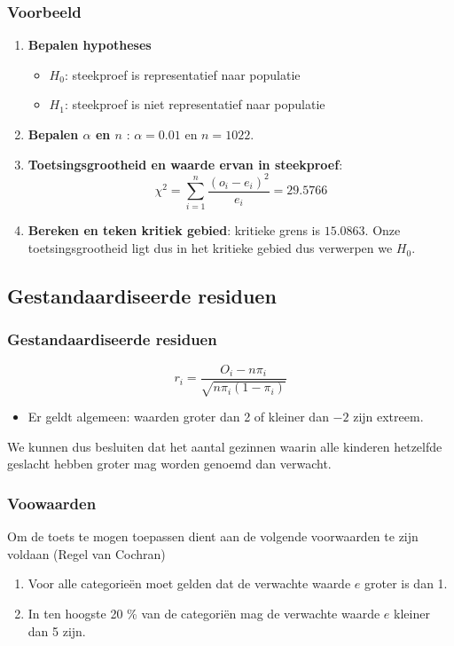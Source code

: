 \documentclass{beamer}
\begin{document}
\begin{frame}
  \frametitle{Voorbeeld}
  \begin{enumerate}
  \item \textbf{Bepalen hypotheses}
    \begin{itemize}
      \item $H_{0}$: steekproef is representatief naar populatie
      \item $H_{1}$: steekproef is niet representatief naar populatie
    \end{itemize}
  \item \textbf{Bepalen $\alpha$ en $n$} : $\alpha = 0.01$ en $n = 1022$.
  \item \textbf{Toetsingsgrootheid en waarde ervan in steekproef}:
  \[ \chi^{2} = \sum_{i=1}^{n} \frac{(o_{i} - e_{i})^{2}}{e_{i}} = 29.5766 \]
  \item \textbf{Bereken en teken kritiek gebied}:  kritieke grens is $15.0863$. Onze toetsingsgrootheid ligt dus in het kritieke gebied dus verwerpen we $H_{0}$.
\end{enumerate}
\end{frame}

\subsection{Gestandaardiseerde residuen}
\begin{frame}
  \frametitle{Gestandaardiseerde residuen}
  \[ r_{i} = \frac{O_{i} - n \pi_{i}}{\sqrt{n \pi_{i}(1-\pi_{i})}} \]

  \begin{itemize}
    \item Er geldt algemeen: waarden groter dan 2 of kleiner dan $-2$ zijn extreem.
  \end{itemize}
  We kunnen dus besluiten dat het aantal gezinnen waarin alle kinderen hetzelfde geslacht hebben groter mag worden genoemd dan verwacht.

\end{frame}

\begin{frame}
  \frametitle{Voowaarden}
   Om de toets te mogen toepassen dient aan de volgende voorwaarden te zijn voldaan (Regel van Cochran)
\begin{enumerate}
  \item Voor alle categorie\"en moet gelden dat de verwachte waarde $e$ groter is dan 1.
  \item In ten hoogste 20 \% van de categori\"en mag de verwachte waarde $e$ kleiner dan 5 zijn.
\end{enumerate}
\end{frame}
\end{document}
